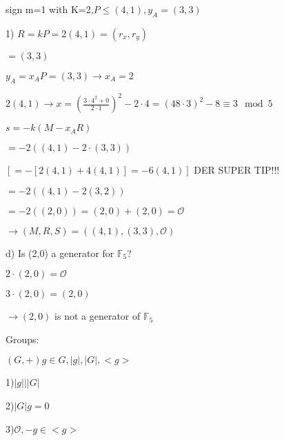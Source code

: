 \documentclass[a4paper]{article}
\begin{document}
sign m=1 with K=2,$P\leq (4,1),y_A=(3,3)$

1) $R=kP=2(4,1)=(r_x,r_y)$

$=(3,3)$

$y_A=x_AP=(3,3)\rightarrow x_A=2$

$2(4,1) \rightarrow x=\left(\frac{3\cdot 4^2+0}{2\cdot1}\right)^2-2\cdot4=(48\cdot3)^2-8\equiv3\mod 5$

$s=-k(M-x_AR)$

$=-2( (4,1) - 2\cdot(3,3))$

$\left[ = - \left[ 2(4,1)+4(4,1) \right] = -6 (4,1) \right]$ DER SUPER TIP!!!

$=-2( (4,1) - 2 (3,2))$

$=-2( (2,0)) = (2,0) + (2,0) = \mathcal{O}$

$\rightarrow (M,R,S) = ( (4,1),(3,3),\mathcal{O})$


d)
Is (2,0) a generator for $\mathbb{F}_5$?

$2\cdot(2,0)=\mathcal{O}$%

$3\cdot(2,0)=(2,0)$

$\rightarrow (2,0)$ is not a generator of $\mathbb{F}_5$


Groups:

$(G,+) g \in G,|g|,|G|,<g>$

1)$|g| \textbf{|} |G|$

2)$|G|g=0$

3)$\mathcal{O},-g \in <g>$
\end{document}
